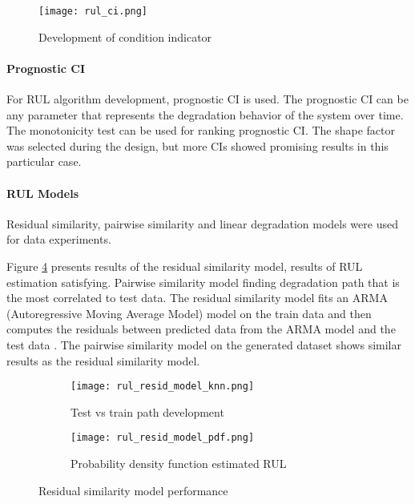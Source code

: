 \begin{figure}[h!]
    \centering
    \texttt{[image: rul\_ci.png]}
    \caption{Development of condition indicator}
    \label{fig:rul_ci}
\end{figure}

\paragraph{Prognostic CI} For RUL algorithm development, prognostic CI is
used. The prognostic CI can be any parameter that represents the
degradation behavior of the system over time. The monotonicity test can be
used for ranking prognostic CI. The shape factor was selected during the
design, but more CIs showed promising results in this particular case.



\paragraph{RUL Models}

Residual similarity, pairwise similarity and linear degradation models were
used for data experiments.


Figure \ref{fig:rul_simil_perfoms} presents results of the residual
similarity model, results of RUL estimation satisfying.  Pairwise
similarity model finding degradation path that is the most correlated to
test data. The residual similarity model fits an ARMA (Autoregressive
Moving Average Model) model on the train data and then computes the
residuals between predicted data from the ARMA model and the test data
\cite{matlab_full}. The pairwise similarity model on the generated dataset
shows similar results as the residual similarity model.



\begin{figure}
    \centering
    \begin{subfigure}[b]{0.55\textwidth}
        \centering
        \texttt{[image: rul\_resid\_model\_knn.png]}
        \caption{Test vs train path development}
        \label{fig:rul_path}
    \end{subfigure}
    \hfill
    \begin{subfigure}[b]{0.4\textwidth}
        \centering
        \texttt{[image: rul\_resid\_model\_pdf.png]}
        \caption{Probability density function estimated RUL}
        \label{fig:rul_pdf}
    \end{subfigure}
    \caption{Residual similarity model performance}
    \label{fig:rul_simil_perfoms}
\end{figure}


